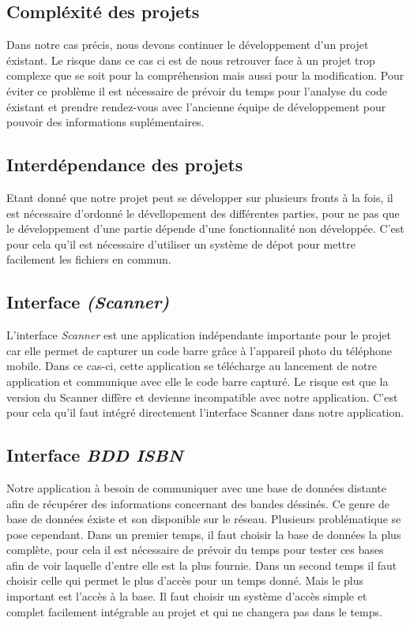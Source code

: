 \documentclass[etudiants]{support-iutrs}
\begin{document}
\subsection{Compléxité des projets}

Dans notre cas précis, nous devons continuer le développement d'un projet éxistant. Le risque dans ce cas ci est de nous retrouver face à un projet trop complexe que se soit pour la compréhension mais aussi pour la modification. Pour éviter ce problème il est nécessaire de prévoir du temps pour l'analyse du code éxistant et prendre rendez-vous avec l'ancienne équipe de développement pour pouvoir des informations suplémentaires. 

\subsection{Interdépendance des projets}

Etant donné que notre projet peut se développer sur plusieurs fronts à la fois, il est nécessaire d'ordonné le dévellopement des différentes parties, pour ne pas que le développement d'une partie dépende d'une fonctionnalité non développée. C'est pour cela qu'il est nécessaire d'utiliser un système de dépot pour mettre facilement les fichiers en commun.

\subsection{Interface \emph{(Scanner)}}

L'interface \emph{Scanner} est une application indépendante importante pour le projet car elle permet de capturer un code barre grâce à l'appareil photo du téléphone mobile. Dans ce cas-ci, cette application se télécharge au lancement de notre application et communique avec elle le code barre capturé. Le risque est que la version du Scanner diffère et devienne incompatible avec notre application. C'est pour cela qu'il faut intégré directement l'interface Scanner dans notre application.

\subsection{Interface \emph{BDD ISBN}}

Notre application à besoin de communiquer avec une base de données distante afin de récupérer des informations concernant des bandes déssinés. Ce genre de base de données éxiste et son disponible sur le réseau. Plusieurs problématique se pose cependant. Dans un premier temps, il faut choisir la base de données la plus complète, pour cela il est nécessaire de prévoir du temps pour tester ces bases afin de voir laquelle d'entre elle est la plus fournie. Dans un second temps il faut choisir celle qui permet le plus d'accès pour un temps donné. Mais le plus important est l'accès à la base. Il faut choisir un système d'accès simple et complet facilement intégrable au projet et qui ne changera pas dans le temps.
\end{document}
